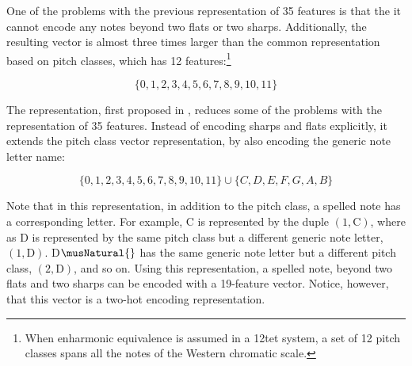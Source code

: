 
One of the problems with the previous representation of 35
features is that the it cannot encode any notes beyond two
flats or two sharps. Additionally, the resulting vector is
almost three times larger than the common representation
based on pitch classes, which has 12 features:\footnote{When
enharmonic equivalence is assumed in a \gls{12tet} system, a
set of 12 pitch classes spans all the notes of the Western
chromatic scale.}

\begin{equation}
    \{0, 1, 2, 3, 4, 5, 6, 7, 8, 9, 10, 11\}
\end{equation}

The representation, first proposed in
\textcite{napoleslopez2021augmentednet}, reduces some of the
problems with the representation of 35 features. Instead of
encoding sharps and flats explicitly, it extends the pitch
class vector representation, by also encoding the generic
note letter name:

\begin{equation}
    \{0, 1, 2, 3, 4, 5, 6, 7, 8, 9, 10, 11\} \cup \{C, D, E, F, G, A, B\}
\end{equation}

Note that in this representation, in addition to the pitch
class, a spelled note has a corresponding letter. For
example, C\musSharp{} is represented by the duple $(1,
\text{C})$, where as D\musFlat{} is represented by the same
pitch class but a different generic note letter, $(1,
\text{D})$. D$\musNatural{}$ has the same generic note
letter but a different pitch class, $(2, \text{D})$, and so
on. Using this representation, a spelled note, beyond two
flats and two sharps can be encoded with a 19-feature
vector. Notice, however, that this vector is a two-hot
encoding representation.
